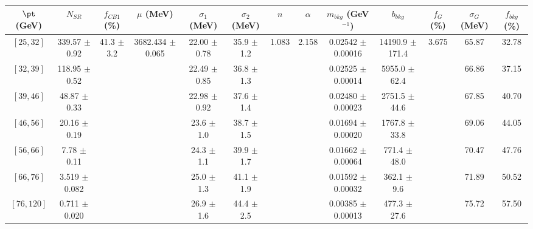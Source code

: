 \begin{tabular}{c||c|c|c|c|c|c|c|c|c|c|c||c}
$\pt$ (GeV) & $N_{SR}$ & $f_{CB1}$ (\%) & $\mu$ (MeV) & $\sigma_1$ (MeV) & $\sigma_2$ (MeV) & $n$ & $\alpha$ & $m_{bkg}$ (GeV$^{-1}$) & $b_{bkg}$ & $f_G$ (\%) & $\sigma_G$ (MeV) & $f_{bkg}$ (\%) \\
\hline
$[25, 32]$ & 339.57 $\pm$ 0.92 & \multirow{7}{*}{41.3 $\pm$ 3.2} & \multirow{7}{*}{3682.434 $\pm$ 0.065} & 22.00 $\pm$ 0.78 & 35.9 $\pm$ 1.2 & \multirow{7}{*}{1.083} & \multirow{7}{*}{2.158} & 0.02542 $\pm$ 0.00016 & 14190.9 $\pm$ 171.4 & \multirow{7}{*}{3.675} & 65.87 & 32.78\\
$[32, 39]$ & 118.95 $\pm$ 0.52 &  &  & 22.49 $\pm$ 0.85 & 36.8 $\pm$ 1.3 &  &  & 0.02525 $\pm$ 0.00014 & 5955.0 $\pm$ 62.4 &  & 66.86 & 37.15\\
$[39, 46]$ & 48.87 $\pm$ 0.33 &  &  & 22.98 $\pm$ 0.92 & 37.6 $\pm$ 1.4 &  &  & 0.02480 $\pm$ 0.00023 & 2751.5 $\pm$ 44.6 &  & 67.85 & 40.70\\
$[46, 56]$ & 20.16 $\pm$ 0.19 &  &  & 23.6 $\pm$ 1.0 & 38.7 $\pm$ 1.5 &  &  & 0.01694 $\pm$ 0.00020 & 1767.8 $\pm$ 33.8 &  & 69.06 & 44.05\\
$[56, 66]$ & 7.78 $\pm$ 0.11 &  &  & 24.3 $\pm$ 1.1 & 39.9 $\pm$ 1.7 &  &  & 0.01662 $\pm$ 0.00064 & 771.4 $\pm$ 48.0 &  & 70.47 & 47.76\\
$[66, 76]$ & 3.519 $\pm$ 0.082 &  &  & 25.0 $\pm$ 1.3 & 41.1 $\pm$ 1.9 &  &  & 0.01592 $\pm$ 0.00032 & 362.1 $\pm$ 9.6 &  & 71.89 & 50.52\\
$[76, 120]$ & 0.711 $\pm$ 0.020 &  &  & 26.9 $\pm$ 1.6 & 44.4 $\pm$ 2.5 &  &  & 0.00385 $\pm$ 0.00013 & 477.3 $\pm$ 27.6 &  & 75.72 & 57.50\\
\end{tabular}
